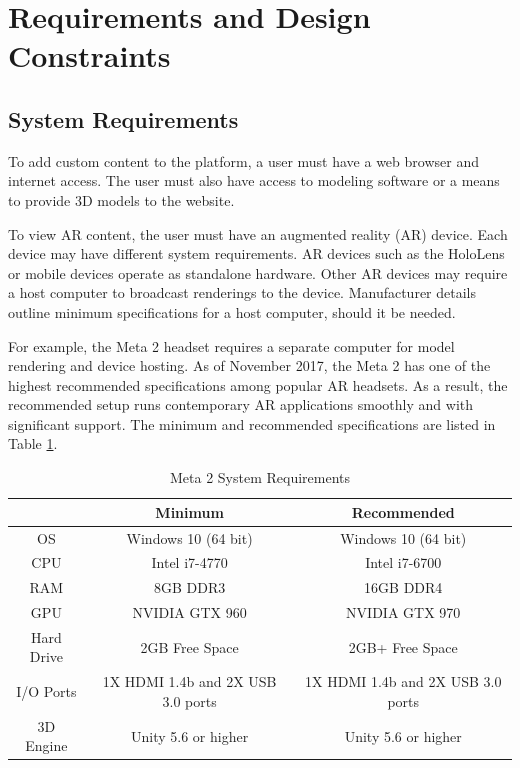 
\section{Requirements and Design Constraints}

\subsection{System Requirements}

To add custom content to the platform, a user must have a web browser and internet access. The user must also have access to modeling software or a means to provide 3D models to the website.

To view AR content, the user must have an augmented reality (AR) device. Each device may have different system requirements. AR devices such as the HoloLens or mobile devices operate as standalone hardware. Other AR devices may require a host computer to broadcast renderings to the device. Manufacturer details outline minimum specifications for a host computer, should it be needed.

For example, the Meta 2 headset requires a separate computer for model rendering and device hosting. As of November 2017, the Meta 2 has one of the highest recommended specifications among popular AR headsets. As a result, the recommended setup runs contemporary AR applications smoothly and with significant support. The minimum and recommended specifications are listed in Table \ref{table:metatwosystemrequirements}.

\begin{table}[H]
	\centering
	\begin{tabular}{ | c | c | c | }
		\hline
		& Minimum & Recommended \\ \hline
		OS & Windows 10 (64 bit) & 	Windows 10 (64 bit) \\ \hline
		CPU & Intel i7-4770 & Intel i7-6700 \\ \hline
		RAM & 8GB DDR3 & 16GB DDR4 \\ \hline
		GPU & NVIDIA GTX 960 & NVIDIA GTX 970 \\ \hline
		Hard Drive & 2GB Free Space & 2GB+ Free Space \\ \hline
		I/O Ports & 1X HDMI 1.4b and 2X USB 3.0 ports & 1X HDMI 1.4b and 2X USB 3.0 ports \\ \hline
		3D Engine & Unity 5.6 or higher & Unity 5.6 or higher \\ \hline
	\end{tabular}

	\caption{Meta 2 System Requirements}
	\label{table:metatwosystemrequirements}
\end{table}

